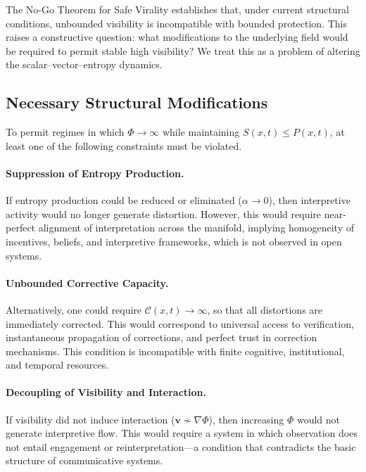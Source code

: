 \documentclass[12pt,a4paper]{article}
\begin{document}
The No-Go Theorem for Safe Virality establishes that, under current structural conditions, unbounded visibility is incompatible with bounded protection. This raises a constructive question: what modifications to the underlying field would be required to permit stable high visibility? We treat this as a problem of altering the scalar--vector--entropy dynamics.

\subsection{Necessary Structural Modifications}

To permit regimes in which $\Phi \to \infty$ while maintaining $S(x,t) \leq P(x,t)$, at least one of the following constraints must be violated.

\paragraph{Suppression of Entropy Production.}
If entropy production could be reduced or eliminated ($\alpha \rightarrow 0$), then interpretive activity would no longer generate distortion. However, this would require near-perfect alignment of interpretation across the manifold, implying homogeneity of incentives, beliefs, and interpretive frameworks, which is not observed in open systems.

\paragraph{Unbounded Corrective Capacity.}
Alternatively, one could require $\mathcal{C}(x,t) \rightarrow \infty$, so that all distortions are immediately corrected. This would correspond to universal access to verification, instantaneous propagation of corrections, and perfect trust in correction mechanisms. This condition is incompatible with finite cognitive, institutional, and temporal resources.

\paragraph{Decoupling of Visibility and Interaction.}
If visibility did not induce interaction ($\mathbf{v} \not\sim \nabla \Phi$), then increasing $\Phi$ would not generate interpretive flow. This would require a system in which observation does not entail engagement or reinterpretation---a condition that contradicts the basic structure of communicative systems.
\end{document}
